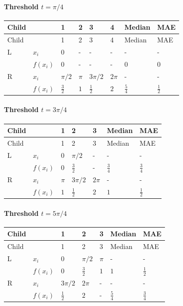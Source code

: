 \documentclass[10pt]{article}
\begin{document}
\paragraph*{Threshold $t=\pi/4$}
\begingroup
\small
\setlength{\tabcolsep}{4pt}
\begin{longtable}{l|l|l|l|l|l|l|l}
Child &  & 1 & 2 & 3 & 4 & Median & MAE \\
\hline
\endfirsthead
Child &  & 1 & 2 & 3 & 4 & Median & MAE \\
\hline
\endhead
L & $x_i$ & $0$ & - & - & - & - & - \\[3pt]
 & $f(x_i)$ & $0$ & - & - & - & $0$ & $0$ \\[3pt]
R & $x_i$ & $\pi/2$ & $\pi$ & $3\pi/2$ & $2\pi$ & - & - \\[3pt]
 & $f(x_i)$ & $\frac{3}{2}$ & $1$ & $\frac{1}{2}$ & $2$ & $\frac{5}{4}$ & $\frac{1}{2}$ \\[3pt]
\end{longtable}
\endgroup
\paragraph*{Threshold $t=3\pi/4$}
\begingroup
\small
\setlength{\tabcolsep}{4pt}
\begin{longtable}{l|l|l|l|l|l|l}
Child &  & 1 & 2 & 3 & Median & MAE \\
\hline
\endfirsthead
Child &  & 1 & 2 & 3 & Median & MAE \\
\hline
\endhead
L & $x_i$ & $0$ & $\pi/2$ & - & - & - \\[3pt]
 & $f(x_i)$ & $0$ & $\frac{3}{2}$ & - & $\frac{3}{4}$ & $\frac{3}{4}$ \\[3pt]
R & $x_i$ & $\pi$ & $3\pi/2$ & $2\pi$ & - & - \\[3pt]
 & $f(x_i)$ & $1$ & $\frac{1}{2}$ & $2$ & $1$ & $\frac{1}{2}$ \\[3pt]
\end{longtable}
\endgroup
\paragraph*{Threshold $t=5\pi/4$}
\begingroup
\small
\setlength{\tabcolsep}{4pt}
\begin{longtable}{l|l|l|l|l|l|l}
Child &  & 1 & 2 & 3 & Median & MAE \\
\hline
\endfirsthead
Child &  & 1 & 2 & 3 & Median & MAE \\
\hline
\endhead
L & $x_i$ & $0$ & $\pi/2$ & $\pi$ & - & - \\[3pt]
 & $f(x_i)$ & $0$ & $\frac{3}{2}$ & $1$ & $1$ & $\frac{1}{2}$ \\[3pt]
R & $x_i$ & $3\pi/2$ & $2\pi$ & - & - & - \\[3pt]
 & $f(x_i)$ & $\frac{1}{2}$ & $2$ & - & $\frac{5}{4}$ & $\frac{3}{4}$ \\[3pt]
\end{longtable}
\endgroup
\end{document}
